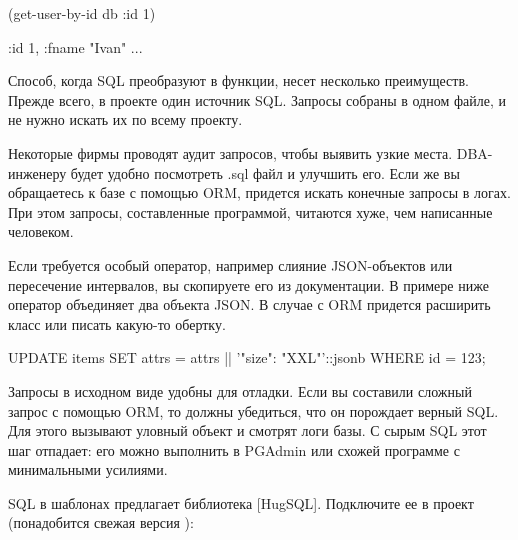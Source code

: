 \begin{english}
  \begin{clojure}
(get-user-by-id db {:id 1})

{:id 1, :fname "Ivan" ...}
  \end{clojure}
\end{english}

Способ, когда SQL преобразуют в функции, несет несколько преимуществ. Прежде всего, в проекте один источник SQL. Запросы собраны в одном файле, и не нужно искать их по всему проекту.

Некоторые фирмы проводят аудит запросов, чтобы выявить узкие места. DBA-инженеру будет удобно посмотреть .sql файл и улучшить его. Если же вы обращаетесь к базе с помощью ORM, придется искать конечные запросы в логах. При этом запросы, составленные программой, читаются хуже, чем написанные человеком.

Если требуется особый оператор, например слияние JSON-объектов или пересечение интервалов, вы скопируете его из документации. В примере ниже оператор \code{||} объединяет два объекта JSON. В случае с ORM придется расширить класс или писать какую-то обертку.

\begin{english}
  \begin{sql}
UPDATE items
  SET attrs = attrs || '{"size": "XXL"}'::jsonb
  WHERE id = 123;
  \end{sql}
\end{english}

Запросы в исходном виде удобны для отладки. Если вы составили сложный запрос с помощью ORM, то должны убедиться, что он порождает верный SQL. Для этого вызывают уловный объект  и смотрят логи базы. С сырым SQL этот шаг отпадает: его можно выполнить в PGAdmin или схожей программе с минимальными усилиями.


\def\urlhugsqlorg{https://www.hugsql.org/}
\def\urlhugsqlgh{https://github.com/layerware/hugsql}

SQL в шаблонах предлагает библиотека \footurl{HugSQL}{\urlhugsqlorg}[HugSQL]. Подключите ее в проект (понадобится свежая версия ):

\begin{english}
  \begin{clojure}
  \end{clojure}
\end{english}

